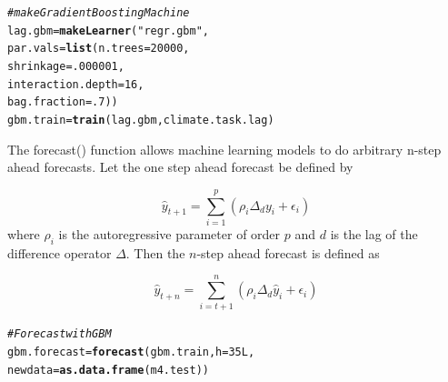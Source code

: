 \documentclass[12pt]{article}\usepackage[]{graphicx}\usepackage[]{color}
\makeatletter
\newcommand{\hlnum}[1]{\textcolor[rgb]{0.686,0.059,0.569}{#1}}%
\newcommand{\hlstr}[1]{\textcolor[rgb]{0.192,0.494,0.8}{#1}}%
\newcommand{\hlcom}[1]{\textcolor[rgb]{0.678,0.584,0.686}{\textit{#1}}}%
\newcommand{\hlstd}[1]{\textcolor[rgb]{0.345,0.345,0.345}{#1}}%
\newcommand{\hlkwb}[1]{\textcolor[rgb]{0.69,0.353,0.396}{#1}}%
\newcommand{\hlkwc}[1]{\textcolor[rgb]{0.333,0.667,0.333}{#1}}%
\newcommand{\hlkwd}[1]{\textcolor[rgb]{0.737,0.353,0.396}{\textbf{#1}}}%
\newenvironment{kframe}{%
 \def\at@end@of@kframe{}%
 \ifinner\ifhmode%
  \def\at@end@of@kframe{\end{minipage}}%
  \begin{minipage}{\columnwidth}%
 \fi\fi%
 \def\FrameCommand##1{\hskip\@totalleftmargin \hskip-\fboxsep
 \colorbox{shadecolor}{##1}\hskip-\fboxsep
     \hskip-\linewidth \hskip-\@totalleftmargin \hskip\columnwidth}%
 \MakeFramed {\advance\hsize-\width
   \@totalleftmargin\z@ \linewidth\hsize
   \@setminipage}}%
 {\par\unskip\endMakeFramed%
 \at@end@of@kframe}
\newenvironment{knitrout}{}{} %
\theoremstyle{definition}
\newcommand\code{\@codex}
\def\@codex#1{{\normalfont\ttfamily\hyphenchar\font=-1 #1}}
\makeatother
\begin{document}
\singlespacing
\begin{knitrout}
\color{fgcolor}\begin{kframe}
\begin{alltt}
\hlcom{# make Gradient Boosting Machine}
\hlstd{lag.gbm} \hlkwb{=} \hlkwd{makeLearner}\hlstd{(}\hlstr{"regr.gbm"}\hlstd{,}
                      \hlkwc{par.vals} \hlstd{=} \hlkwd{list}\hlstd{(}\hlkwc{n.trees} \hlstd{=} \hlnum{20000}\hlstd{,}
                                      \hlkwc{shrinkage} \hlstd{=} \hlnum{.000001}\hlstd{,}
                                      \hlkwc{interaction.depth} \hlstd{=} \hlnum{16}\hlstd{,}
                                      \hlkwc{bag.fraction} \hlstd{=} \hlnum{.7}\hlstd{))}
\hlstd{gbm.train} \hlkwb{=} \hlkwd{train}\hlstd{(lag.gbm, climate.task.lag)}
\end{alltt}
\end{kframe}
\end{knitrout}


\doublespacing

The \code{forecast()} function allows machine learning models to do arbitrary n-step ahead forecasts. Let the one step ahead forecast be defined by

\begin{equation}
\hat{y}_{t+1} = \sum_{i=1}^p \left(\rho_i \Delta_d y_{i} + \epsilon_{i}\right)
\end{equation}
where $\rho_i$ is the autoregressive parameter of order $p$ and $d$ is the lag of the difference operator $\Delta$. Then the $n$-step ahead forecast is defined as

\begin{equation}
\hat{y}_{t+n} = \sum_{i=t+1}^{n} \left(\rho_i \Delta_d \hat{y}_{i} + \epsilon_{i}\right)
\end{equation}


\singlespacing
\begin{knitrout}
\color{fgcolor}\begin{kframe}
\begin{alltt}
\hlcom{# Forecast with GBM}
\hlstd{gbm.forecast} \hlkwb{=} \hlkwd{forecast}\hlstd{(gbm.train,} \hlkwc{h} \hlstd{=} \hlnum{35L}\hlstd{,}
                        \hlkwc{newdata} \hlstd{=} \hlkwd{as.data.frame}\hlstd{(m4.test))}
\end{alltt}
\end{kframe}
\end{knitrout}
\end{document}
